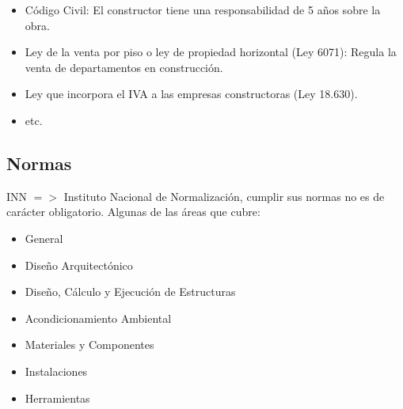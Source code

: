 \documentclass{article} %
\begin{document}
\begin{itemize}[label={},left=0pt,align=parleft]
    \item \begin{highlightbox}[levelone] Código Civil: El constructor tiene una responsabilidad de 5 años sobre la obra. \end{highlightbox}
    \item \begin{highlightbox}[levelone] Ley de la venta por piso o ley de propiedad horizontal (Ley 6071): Regula la venta de departamentos en construcción. \end{highlightbox}
    \item \begin{highlightbox}[levelone] Ley que incorpora el IVA a las empresas constructoras (Ley 18.630). \end{highlightbox}
    \item \begin{highlightbox}[levelone] etc. \end{highlightbox}
\end{itemize}

\subsection{Normas}

INN $=>$ Instituto Nacional de Normalización, cumplir sus normas no es de carácter obligatorio. Algunas de las áreas que cubre:

\begin{itemize}[label={},left=0pt,align=parleft]
    \item \begin{highlightbox}[levelone] General \end{highlightbox}
    \item \begin{highlightbox}[levelone] Diseño Arquitectónico \end{highlightbox}
    \item \begin{highlightbox}[levelone] Diseño, Cálculo y Ejecución de Estructuras \end{highlightbox}
    \item \begin{highlightbox}[levelone] Acondicionamiento Ambiental \end{highlightbox}
    \item \begin{highlightbox}[levelone] Materiales y Componentes \end{highlightbox}
    \item \begin{highlightbox}[levelone] Instalaciones \end{highlightbox}
    \item \begin{highlightbox}[levelone] Herramientas \end{highlightbox}
\end{itemize}
\end{document}
